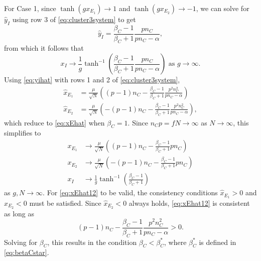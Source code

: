\documentclass[reqno]{siamonline190516}
\begin{document}
\noindent For Case 1, since $\tanh(g x_{E_1}) \rightarrow 1$ and $\tanh(g x_{E_2}) \rightarrow -1$, we can solve for $\hat{y}_I$ using row 3 of \cref{eq:cluster3system} to get
\begin{equation}\label{eq:yihat}
    \hat{y}_I = \frac{\beta_C - 1}{\beta_C+1} \frac{p n_C}{p n_C - \alpha},
\end{equation} 
from which it follows that
\begin{equation}\label{eq:xilimiteq}
    x_I \rightarrow \frac{1}{g}\tanh^{-1}\left( \frac{\beta_C - 1}{\beta_C+1} \frac{p n_C}{p n_C - \alpha} \right) \text{ as } g \rightarrow \infty.
\end{equation}
Using \cref{eq:yihat} with rows 1 and 2 of \cref{eq:cluster3system},
\begin{equation}\label{eq:xEhat12}
\begin{aligned}
    \hat{x}_{E_1} &= \frac{\mu}{\sqrt{N}}\left( (p-1)n_C - \frac{\beta_C - 1}{\beta_C+1} \frac{p^2 n_C^2}{p n_C - \alpha} \right) \\
    \hat{x}_{E_2} &= \frac{\mu}{\sqrt{N}}\left( -(p-1)n_C - \frac{\beta_C - 1}{\beta_C+1} \frac{p^2 n_C^2}{p n_C - \alpha} \right),
\end{aligned}
\end{equation}
which reduce to \cref{eq:xEhat} when $\beta_C = 1$. Since $n_C p = f N \rightarrow \infty$ as $N \rightarrow \infty$, this simplifies to
\begin{equation}\label{eq:xEhat12IlargeN}
    \begin{aligned}
        x_{E_1} &\rightarrow\frac{\mu}{\sqrt{N}}\left( (p-1)n_C - \frac{\beta_C - 1}{\beta_C+1} p n_C \right) \\
        x_{E_2} &\rightarrow \frac{\mu}{\sqrt{N}}\left( -(p-1)n_C - \frac{\beta_C - 1}{\beta_C+1} p n_C \right) \\
        x_I &\rightarrow \frac{1}{g}\tanh^{-1}\left( \frac{\beta_C - 1}{\beta_C+1} \right)
    \end{aligned}
\end{equation}
as $g, N \rightarrow \infty$. For \cref{eq:xEhat12} to be valid, the consistency conditions $\hat{x}_{E_1} > 0$ and $\hat{x}_{E_2} < 0$ must be satisfied. Since $\hat{x}_{E_2} < 0$ always holds, \cref{eq:xEhat12} is consistent as long as
\begin{equation}\label{eq:betaCineq}
(p-1)n_C - \frac{\beta_C - 1}{\beta_C+1}\frac{p^2 n_C^2}{p n_C - \alpha}  > 0.
\end{equation}
Solving for $\beta_C$, this results in the condition $\beta_C < \beta_C^*$, where $\beta_C^*$ is defined in \ref{eq:betaCstar}.
\end{document}

